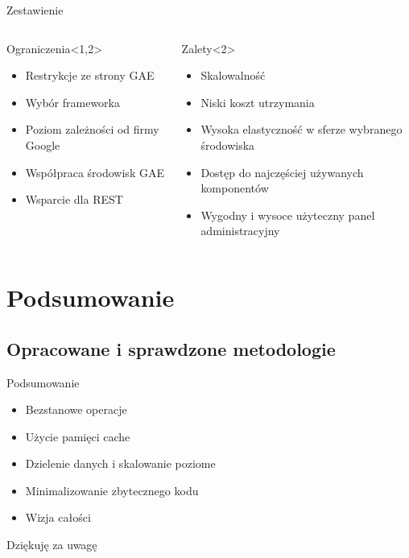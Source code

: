 \documentclass[slitetop]{beamer}
\begin{document}
\begin{frame}{Zestawienie}
\begin{columns}
    \begin{alertblock}{Ograniczenia}<1,2>
    \begin{itemize}
        \item{Restrykcje ze strony GAE}
        \item{Wybór frameworka}
        \item{Poziom zależności od firmy Google}
        \item{Współpraca środowisk GAE}
        \item{Wsparcie dla REST}
  \end{itemize}
  \end{alertblock}
    \begin{exampleblock}{Zalety}<2>
    \begin{itemize}
        \item{Skalowalność}
        \item{Niski koszt utrzymania} 
        \item{Wysoka elastyczność w sferze wybranego środowiska} 
        \item{Dostęp do najczęściej używanych komponentów}
        \item{Wygodny i wysoce użyteczny panel administracyjny}
    \end{itemize}
    \end{exampleblock}
\end{columns}
\end{frame}



\section{Podsumowanie}
\subsection{Opracowane i sprawdzone metodologie}

\begin{frame}{Podsumowanie}
\begin{itemize}
\item{Bezstanowe operacje}
\item{Użycie pamięci cache}
\item{Dzielenie danych i skalowanie poziome}
\item{Minimalizowanie zbytecznego kodu}
\item{Wizja całości}
\end{itemize}
\end{frame}

\begin{frame}{}
\begin{center}
\huge{Dziękuję za uwagę}
\end{center}
\end{frame}
\end{document}
